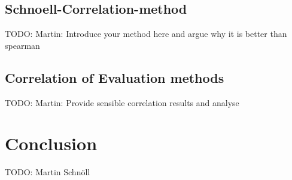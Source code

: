 \documentclass[10pt,twocolumn,letterpaper]{article}
\begin{document}
\subsection{Schnoell-Correlation-method}
TODO: Martin: Introduce your method here and argue why it is better than spearman

\subsection{Correlation of Evaluation methods}
TODO: Martin:
Provide sensible correlation results and analyse


\section{Conclusion}
TODO: Martin Schnöll


{\small


}
\end{document}
